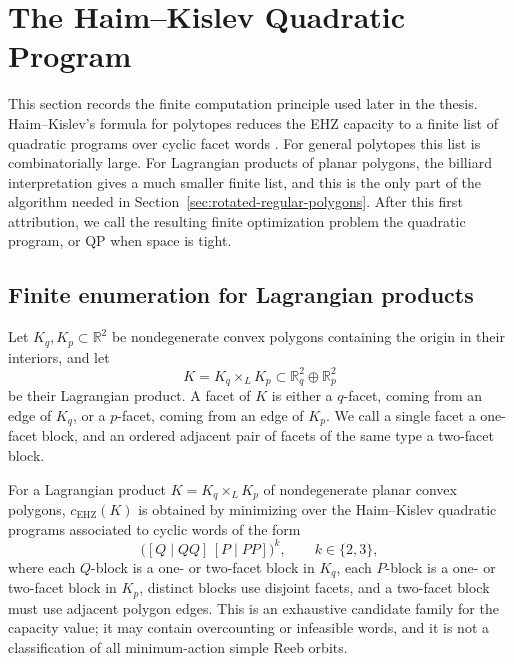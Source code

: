 \section{The Haim--Kislev Quadratic Program}
\label{sec:quadratic-program-algorithm-hk2019}

This section records the finite computation principle used later in the
thesis. Haim--Kislev's formula for polytopes reduces the EHZ capacity to a
finite list of quadratic programs over cyclic facet words
\cite{HK2017}. For general polytopes this list is combinatorially large. For
Lagrangian products of planar polygons, the billiard interpretation gives a
much smaller finite list, and this is the only part of the algorithm needed in
Section~\ref{sec:rotated-regular-polygons}.
After this first attribution, we call the resulting finite optimization problem
the quadratic program, or QP when space is tight.

\subsection{Finite enumeration for Lagrangian products}
\label{subsec:quadratic-program-algorithm-hk2019-lagrangian-products}

Let \(K_q,K_p\subset\mathbb{R}^2\) be nondegenerate convex polygons containing
the origin in their interiors, and let
\[
  K=K_q\times_L K_p\subset\mathbb{R}^2_q\oplus\mathbb{R}^2_p
\]
be their Lagrangian product. A facet of \(K\) is either a \(q\)-facet,
coming from an edge of \(K_q\), or a \(p\)-facet, coming from an edge of
\(K_p\). We call a single facet a one-facet block, and an ordered adjacent pair
of facets of the same type a two-facet block.

\begin{theorem}
\label{thm:lagrangian-product-finite-enumeration}
For a Lagrangian product \(K=K_q\times_L K_p\) of nondegenerate planar convex
polygons, \(c_{\mathrm{EHZ}}(K)\) is obtained by minimizing over the
Haim--Kislev quadratic programs associated to cyclic words of the form
\[
  \bigl([Q\mid QQ]\,[P\mid PP]\bigr)^k,
  \qquad k\in\{2,3\},
\]
where each \(Q\)-block is a one- or two-facet block in \(K_q\), each
\(P\)-block is a one- or two-facet block in \(K_p\), distinct blocks use
disjoint facets, and a two-facet block must use adjacent polygon edges. This is
an exhaustive candidate family for the capacity value; it may contain
overcounting or infeasible words, and it is not a classification of all
minimum-action simple Reeb orbits.
\end{theorem}

